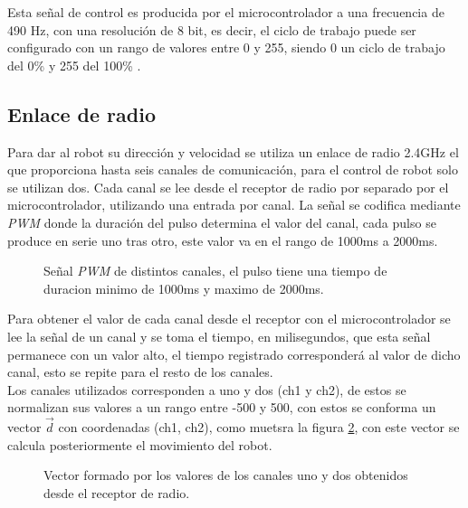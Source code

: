 \documentclass{iccmemoria}
\begin{document}
Esta señal de control es producida por el microcontrolador a una frecuencia de 490 Hz, con una resolución de 8 bit, es decir, el ciclo de trabajo puede ser configurado con un rango de valores entre 0 y 255, siendo 0 un ciclo de trabajo del 0\% y 255 del 100\% \cite{referenceAnalogWrite}.\\

\subsection{Enlace de radio}

Para dar al robot su dirección y velocidad se utiliza un enlace de radio 2.4GHz el que proporciona hasta seis canales de comunicación, para el control de robot solo se utilizan dos. Cada canal se lee desde el receptor de radio por separado por el microcontrolador, utilizando una entrada por canal. La señal se codifica mediante \emph{PWM} donde la duración del pulso determina el valor del canal, cada pulso se produce en serie uno tras otro, este valor va en el rango de 1000ms a 2000ms.\\

\begin{figure}[H]
  \centering
  \selectfont{
  
  }
  \caption{Señal \emph{PWM} de distintos canales, el pulso tiene una tiempo de duracion minimo de 1000ms y maximo de 2000ms.}
  \label{fig:pwm}
\end{figure}

Para obtener el valor de cada canal desde el receptor con el microcontrolador se lee la señal de un canal y se toma el tiempo, en milisegundos, que esta señal permanece con un valor alto, el tiempo registrado corresponderá al valor de dicho canal, esto se repite para el resto de los canales.\\
 
Los canales utilizados corresponden a uno y dos (ch1 y ch2), de estos se normalizan sus valores a un rango entre -500 y 500, con estos se conforma un vector $\vec{d}$ con coordenadas (ch1, ch2), como muetsra la figura \ref{fig:radio_values}, con este vector se calcula posteriormente el movimiento del robot.\\

\begin{figure}[H]
  \centering
  \selectfont{
  
  }
  \caption{Vector formado por los valores de los canales uno y dos obtenidos desde el receptor de radio.}
  \label{fig:radio_values}
\end{figure}
\end{document}

